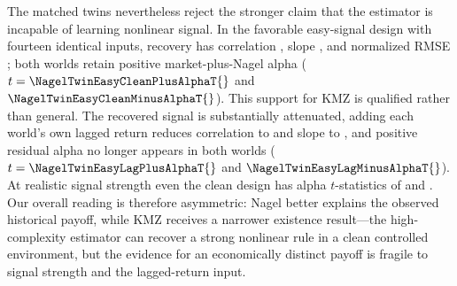 The matched twins nevertheless reject the stronger claim that the estimator
is incapable of learning nonlinear signal. In the favorable easy-signal design
with fourteen identical inputs, recovery has correlation
\NagelTwinEasyCleanCorr, slope \NagelTwinEasyCleanSlope, and normalized RMSE
\NagelTwinEasyCleanNRMSE; both worlds retain positive market-plus-Nagel alpha
($t=\NagelTwinEasyCleanPlusAlphaT{}$ and
$\NagelTwinEasyCleanMinusAlphaT{}$). This support for KMZ is qualified rather
than general. The recovered signal is substantially attenuated, adding each
world's own lagged return reduces correlation to \NagelTwinEasyLagCorr{} and
slope to \NagelTwinEasyLagSlope, and positive residual alpha no longer appears
in both worlds ($t=\NagelTwinEasyLagPlusAlphaT{}$ and
$\NagelTwinEasyLagMinusAlphaT{}$). At realistic signal strength even the clean
design has alpha $t$-statistics of \NagelTwinRealCleanPlusAlphaT{} and
\NagelTwinRealCleanMinusAlphaT. Our overall reading is therefore asymmetric:
Nagel better explains the observed historical payoff, while KMZ receives a
narrower existence result---the high-complexity estimator can recover a strong
nonlinear rule in a clean controlled environment, but the evidence for an
economically distinct payoff is fragile to signal strength and the
lagged-return input.
